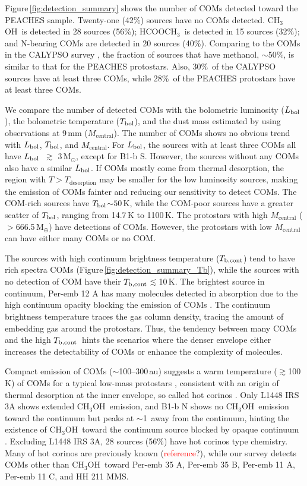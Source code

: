 \documentclass[twocolumn]{aastex62}
\newcommand{\msun}{\mbox{\,M$_\odot$}}
\newcommand{\mearth}{\mbox{\,M$_\oplus$}}
\newcommand{\lbol}{\mbox{$L_{\rm bol}$}}
\newcommand{\tbol}{\mbox{$T_{\rm bol}$}}
\newcommand{\tbc}{\mbox{$T_{\rm b, cont}$}}
\newcommand{\methylformate}{\mbox{HCOOCH$_{3}$}}
\newcommand{\methanol}{\mbox{CH$_{3}$OH}}
\newcommand{\refnote}{\textcolor{red}{reference}}
\begin{document}
Figure\,\ref{fig:detection_summary} shows the number of COMs detected toward the PEACHES sample.  Twenty-one (42\%) sources have no COMs detected.  \methanol\ is detected in 28 sources (56\%); \methylformate\ is detected in 15 sources (32\%); and N-bearing COMs are detected in 20 sources (40\%).  Comparing to the COMs in the CALYPSO survey \citep{2020A&A...635A.198B}, the fraction of sources that have methanol, $\sim$50\%, is similar to that for the PEACHES protostars.  Also, 30\%\ of the CALYPSO sources have at least three COMs, while 28\%\ of the PEACHES protostars have at least three COMs.  

We compare the number of detected COMs with the bolometric luminosity (\lbol), the bolometric temperature (\tbol), and the dust mass estimated by \citet{2020arXiv200602812T} using observations at 9\,mm ($M_\text{central}$).  The number of COMs shows no obvious trend with \lbol, \tbol, and $M_\text{central}$.  For \lbol, the sources with at least three COMs all have \lbol\ $\gtrsim$ 3\msun, except for B1-b S.  However, the sources without any COMs also have a similar \lbol.  If COMs mostly come from thermal desorption, the region with $T > T_\text{desorption}$ may be smaller for the low luminosity sources, making the emission of COMs fainter and reducing our sensitivity to detect COMs.
The COM-rich sources have \tbol$\sim 50$\,K, while the COM-poor sources have a greater scatter of \tbol, ranging from 14.7\,K to 1100\,K.  The protostars with high $M_\text{central}$ ($>$666.5\mearth) have detections of COMs.  However, the protostars with low $M_\text{central}$ can have either many COMs or no COM.

The sources with high continuum brightness temperature (\tbc) tend to have rich spectra COMs (Figure\,\ref{fig:detection_summary_Tb}), while the sources with no detection of COM have their \tbc$\lesssim$10\,K.  The brightest source in continuum, Per-emb 12 A has many molecules detected in absorption due to the high continuum opacity blocking the emission of COMs \citep{2019ApJ...872..196S,2020ApJ...896L...3D}.  The continuum brightness temperature traces the gas column density, tracing the amount of embedding gas around the protostars.  
Thus, the tendency between many COMs and the high \tbc\ hints the scenarios where the denser envelope either increases the detectability of COMs or enhance the complexity of molecules.

Compact emission of COMs ($\sim$100--300\,au) suggests a warm temperature ($\gtrsim$100\,K) of COMs for a typical low-mass protostars \citep[e.g. ][]{2017ApJ...835..259Y}, consistent with an origin of thermal desorption at the inner envelope, so called hot corinos \citep{2004ASPC..323..195C}.  Only L1448 IRS 3A shows extended \methanol\ emission, and B1-b N shows no \methanol\ emission toward the continuum but peaks at $\sim$1\arcsec\ away from the continuum, hinting the existence of \methanol\ toward the continuum source blocked by opaque continuum \citep{2018A&A...620A..80M}.  Excluding L1448 IRS 3A, 28 sources (56\%) have hot corinos type chemistry.  Many of hot corinos are previously known (\refnote?), while our survey detects COMs other than \methanol\ toward Per-emb 35 A, Per-emb 35 B, Per-emb 11 A, Per-emb 11 C, and HH 211 MMS.
\end{document}

